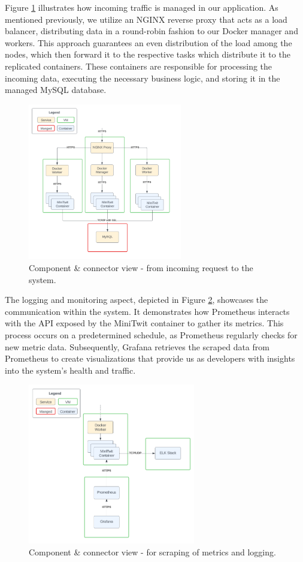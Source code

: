Figure \ref{fig:2} illustrates how incoming traffic is managed in our application. As mentioned previously, we utilize an NGINX reverse proxy that acts as a load balancer, distributing data in a round-robin fashion to our Docker manager and workers. This approach guarantees an even distribution of the load among the nodes, which then forward it to the respective tasks which distribute it to the replicated containers. These containers are responsible for processing the incoming data, executing the necessary business logic, and storing it in the managed MySQL database.
\begin{figure}[H]
  \centering
  \includegraphics[width=0.60\textwidth]{images/system perspective/OverView1.png}
  \caption{Component \& connector view - from incoming request to the system.}
  \label{fig:2}
\end{figure}
The logging and monitoring aspect, depicted in Figure \ref{fig:3}, showcases the communication within the system. It demonstrates how Prometheus interacts with the API exposed by the MiniTwit container to gather its metrics. This process occurs on a predetermined schedule, as Prometheus regularly checks for new metric data. Subsequently, Grafana retrieves the scraped data from Prometheus to create visualizations that provide us as developers with insights into the system's health and traffic.
\begin{figure}[H]
  \centering
  \includegraphics[width=0.65\textwidth]{images/system perspective/OverViewZoom1.png}
  \caption{Component \& connector view - for scraping of metrics and logging.}
  \label{fig:3}
\end{figure}
